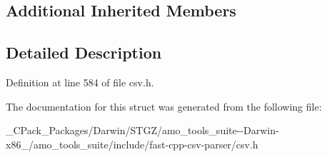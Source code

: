 \subsection*{Additional Inherited Members}


\subsection{Detailed Description}


Definition at line 584 of file csv.\+h.



The documentation for this struct was generated from the following file\+:\begin{DoxyCompactItemize}
\item 
\+\_\+\+C\+Pack\+\_\+\+Packages/\+Darwin/\+S\+T\+G\+Z/amo\+\_\+tools\+\_\+suite-\/-\/\+Darwin-\/x86\+\_/amo\+\_\+tools\+\_\+suite/include/fast-\/cpp-\/csv-\/parser/csv.\+h\end{DoxyCompactItemize}
